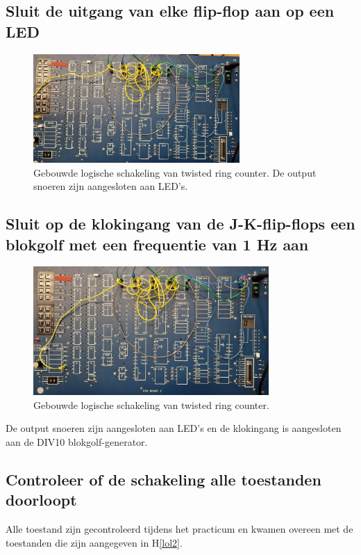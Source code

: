 \documentclass[12pt]{article}
\begin{document}
\subsection{Sluit de uitgang van elke flip-flop aan op een LED}
\begin{figure}[h]
    \centering
    \includegraphics[width=0.7\textwidth]{1jc2.jpg}
    \caption{Gebouwde logische schakeling van twisted ring counter. De output snoeren zijn aangesloten aan LED's.}
    \label{fig:john112}
\end{figure} 
\pagebreak 
\subsection{Sluit op de klokingang van de J-K-flip-flops een blokgolf met een frequentie van 1 Hz aan}
\begin{figure}[h]
    \centering
    \includegraphics[width=0.8\textwidth]{1jc3.jpg}
    \caption{Gebouwde logische schakeling van twisted ring counter.}
    \label{fig:john113}
\end{figure} 
De output snoeren zijn aangesloten aan LED's en de klokingang is aangesloten aan de DIV10 blokgolf-generator.
\subsection{Controleer of de schakeling alle toestanden doorloopt}
Alle toestand zijn gecontroleerd tijdens het practicum en kwamen overeen met de toestanden die zijn aangegeven in H\ref{lol2}.
\pagebreak
\end{document}
